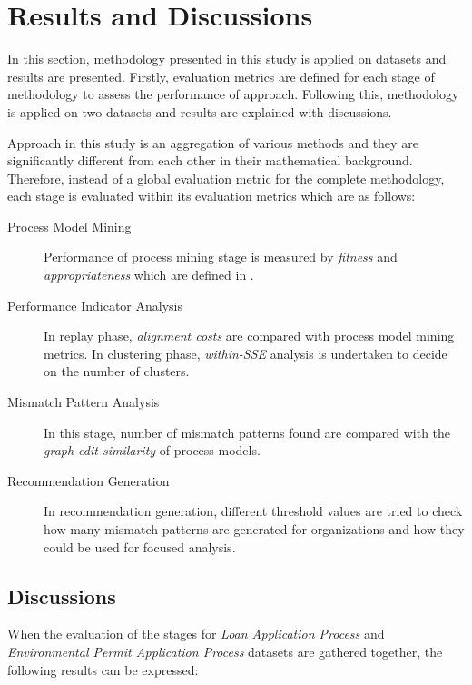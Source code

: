 \section{Results and Discussions}
\label{sec:results-and-discussions}

In this section, methodology presented in this study is applied on datasets and results are presented. Firstly, evaluation metrics are defined for each stage of methodology to assess the performance of approach. Following this, methodology is applied on two datasets and results are explained with discussions.

Approach in this study is an aggregation of various methods and they are significantly different from each other in their mathematical background. Therefore, instead of a global evaluation metric for the complete methodology, each stage is evaluated within its evaluation metrics which are as follows:
\begin{description}
	\item[Process Model Mining] Performance of process mining stage is measured by \textit{fitness} and \textit{appropriateness} which are defined in \cite{rozinat2008conformance}.
	\item[Performance Indicator Analysis] In replay phase, \textit{alignment costs} \cite{van2012replaying} are compared with process model mining metrics. In clustering phase, \textit{within-SSE} analysis is undertaken to decide on the number of clusters.
	\item[Mismatch Pattern Analysis] In this stage, number of mismatch patterns found are compared with the \textit{graph-edit similarity} \cite{dijkman2011similarity} of process models.
	\item[Recommendation Generation] In recommendation generation, different threshold values are tried to check how many mismatch patterns are generated for organizations and how they could be used for focused analysis.
\end{description}




\subsection{Discussions}
\label{subsec:discussions}
When the evaluation of the stages for \textit{Loan Application Process} and \textit{Environmental Permit Application Process} datasets are gathered together, the following results can be expressed:

